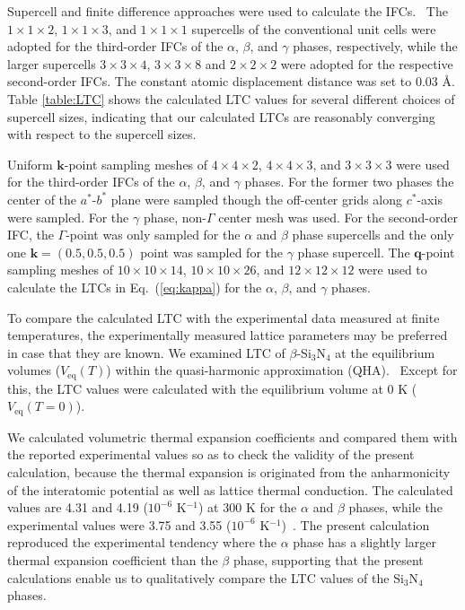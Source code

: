 \documentclass[twocolumn,amsmath,amssymb,a4paper,prb,superscriptaddress,floatfix]{revtex4-1}
\begin{document}
Supercell and finite difference approaches were used to calculate the
IFCs.~\cite{wei-supercell} The $1\times 1\times2$, $1\times 1\times3$, and $1\times
1\times1$ supercells of the conventional unit cells were adopted for the
third-order IFCs of the $\alpha$, $\beta$, and $\gamma$ phases,
respectively, while the larger supercells $3\times 3\times4$, $3\times
3\times8$ and $2\times 2\times2$ were adopted for the respective
second-order IFCs. The constant atomic displacement distance was set to
0.03 \AA. Table \ref{table:LTC} shows the calculated LTC values for
several different choices of supercell sizes, indicating that our
calculated LTCs are reasonably converging with respect to the supercell
sizes.

Uniform $\mathbf{k}$-point sampling meshes of $4\times 4\times 2$,
$4\times 4\times 3$, and $3\times 3\times 3$ were used for the
third-order IFCs of the $\alpha$, $\beta$, and $\gamma$ phases. For the
former two phases the center of the $a^*$-$b^*$ plane were sampled
though the off-center grids along $c^*$-axis were sampled. For the
$\gamma$ phase, non-$\Gamma$ center mesh was used. For the second-order
IFC, the $\Gamma$-point was only sampled for the $\alpha$ and $\beta$
phase supercells and the only one $\mathbf{k}=(0.5, 0.5, 0.5)$ point was
sampled for the $\gamma$ phase supercell. The $\mathbf{q}$-point
sampling meshes of $10\times 10\times 14$, $10\times 10\times 26$, and
$12\times 12\times 12$ were used to calculate the LTCs in Eq.~(\ref{eq:kappa})
for the $\alpha$, $\beta$, and $\gamma$ phases.

To compare the calculated LTC with the experimental data measured at
finite temperatures, the experimentally measured lattice parameters may 
be preferred in case that they are known. We examined LTC of
$\beta$-Si$_3$N$_4$ at the equilibrium volumes ($V_\text{eq}(T)$) within the
quasi-harmonic approximation (QHA).~\cite{dove-p76} Except for this, the LTC values
were calculated with the equilibrium volume at 0 K ($V_\text{eq}(T=0)$).

We calculated volumetric thermal expansion coefficients and compared them with
the reported experimental values so as to check the validity of the present
calculation, because the thermal expansion is originated from the anharmonicity
of the interatomic potential as well as lattice thermal conduction. The
calculated values are 4.31 and 4.19 ($10^{-6}$ K$^{-1}$) at 300 K for the
$\alpha$ and $\beta$ phases, while the experimental values were 3.75 and 3.55
($10^{-6}$ K$^{-1}$)~\cite{minikayev-alpha}. The present calculation reproduced
the experimental tendency where the $\alpha$ phase has a slightly larger
thermal expansion coefficient than the $\beta$ phase, supporting that the
present calculations enable us to qualitatively compare the LTC values of the
Si$_3$N$_4$ phases.
\end{document}
